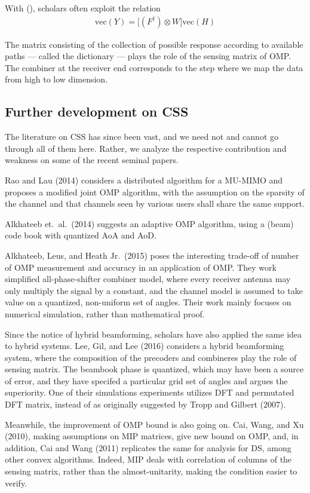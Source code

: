 \documentclass[12pt]{article}
\begin{document}
With (), scholars often exploit the relation
\begin{gather}
\mathrm{vec}(Y)
=\big[ (F^\dagger) \otimes W \big] \mathrm{vec}(H)
\end{gather}

The matrix consisting of the collection of possible response according to available paths --- called the dictionary --- plays the role of the sensing matrix of OMP.
The combiner at the receiver end corresponds to the step where we map the data from high to low dimension.


\subsection{Further development on CSS}

The literature on CSS has since been vast, and we need not and cannot go through all of them here.
Rather, we analyze the respective contribution and weakness on some of the recent seminal papers.

Rao and Lau (2014) considers a distributed algorithm for a MU-MIMO and proposes a modified joint OMP algorithm, with the assumption on the sparsity of the channel and that channels seen by various users shall share the same support.

Alkhateeb et.\ al.\ (2014) suggests an adaptive OMP algorithm, using a (beam) code book with quantized AoA and AoD.

Alkhateeb, Leus, and Heath Jr.\ (2015) poses the interesting trade-off of number of OMP measurement and accuracy in an application of OMP.
They work simplified all-phase-shifter combiner model, where every receiver antenna may only multiply the signal by a constant, and the channel model is assumed to take value on a quantized, non-uniform set of angles.
Their work mainly focuses on numerical simulation, rather than mathematical proof.

Since the notice of hybrid beamforming, scholars have also applied the same idea to hybrid systems.
Lee, Gil, and Lee (2016) considers a hybrid beamforming system, where the composition of the precoders and combineres play the role of sensing matrix.
The beambook phase is quantized, which may have been a source of error, and they have specifed a particular grid set of angles and argues the superiority.
One of their simulations experiments utilizes DFT and permutated DFT matrix, instead of as originally suggested by Tropp and Gilbert (2007).

Meanwhile, the improvement of OMP bound is also going on.
Cai, Wang, and Xu (2010), making assumptions on MIP matrices, give new bound on OMP, and, in addition, Cai and Wang (2011) replicates the same for analysis for DS, among other convex algorithms.
Indeed, MIP deals with correlation of columns of the sensing matrix, rather than the almost-unitarity, making the condition easier to verify.
\end{document}
